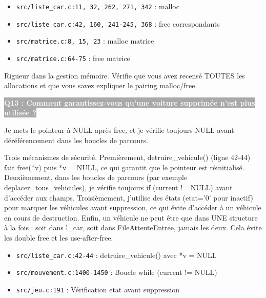 \documentclass[12pt,a4paper]{article}
\newcommand{\question}[1]{%
    \vspace{0.5cm}
    \noindent\colorbox{darkgray}{\textcolor{white}{\textbf{#1}}}
    \vspace{0.3cm}
}
\begin{document}
\begin{reference_code}
\begin{itemize}
    \item \texttt{src/liste\_car.c:11, 32, 262, 271, 342} : malloc
    \item \texttt{src/liste\_car.c:42, 160, 241-245, 368} : free correspondants
    \item \texttt{src/matrice.c:8, 15, 23} : malloc matrice
    \item \texttt{src/matrice.c:64-75} : free matrice
\end{itemize}
\end{reference_code}

\begin{objectif_prof}
Rigueur dans la gestion mémoire. Vérifie que vous avez recensé TOUTES les allocations et que vous savez expliquer le pairing malloc/free.
\end{objectif_prof}

\question{Q13 : Comment garantissez-vous qu'une voiture supprimée n'est plus utilisée ?}

\begin{reponse_courte}
Je mets le pointeur à NULL après free, et je vérifie toujours NULL avant déréférencement dans les boucles de parcours.
\end{reponse_courte}

\begin{reponse_longue}
Trois mécanismes de sécurité. Premièrement, detruire\_vehicule() (ligne 42-44) fait free(*v) puis *v = NULL, ce qui garantit que le pointeur est réinitialisé. Deuxièmement, dans les boucles de parcours (par exemple deplacer\_tous\_vehicules), je vérifie toujours if (current != NULL) avant d'accéder aux champs. Troisièmement, j'utilise des états (etat='0' pour inactif) pour marquer les véhicules avant suppression, ce qui évite d'accéder à un véhicule en cours de destruction. Enfin, un véhicule ne peut être que dans UNE structure à la fois : soit dans l\_car, soit dans FileAttenteEntree, jamais les deux. Cela évite les double free et les use-after-free.
\end{reponse_longue}

\begin{reference_code}
\begin{itemize}
    \item \texttt{src/liste\_car.c:42-44} : detruire\_vehicule() avec *v = NULL
    \item \texttt{src/mouvement.c:1400-1450} : Boucle while (current != NULL)
    \item \texttt{src/jeu.c:191} : Vérification etat avant suppression
\end{itemize}
\end{reference_code}
\end{document}
